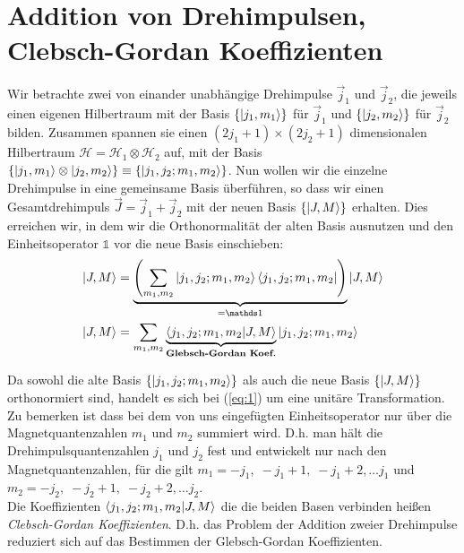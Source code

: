 







\section*{Addition von Drehimpulsen,\\
  Clebsch-Gordan Koeffizienten}
\label{sec:addit-von-dreh}

Wir betrachte zwei von einander unabhängige Drehimpulse \(\vec j_1\) und \(\vec
j_2\), die jeweils einen eigenen Hilbertraum mit der Basis \(\{\left| j_1,m_1 \right\rangle\}\)
für \(\vec j_1\) und \(\{\left| j_2,m_2 \right\rangle\}\) für \(\vec j_2\) bilden. Zusammen
spannen sie einen \((2j_1+1) \times (2j_2+1)\) dimensionalen Hilbertraum
\(\mathcal H = \mathcal H_1 \otimes \mathcal H_2\) auf, mit der Basis
\(\{\left| j_1,m_1 \right\rangle \otimes \left| j_2,m_2 \right\rangle\} \equiv \{\left| j_1,j_2;m_1,m_2 \right\rangle\}\).
Nun wollen wir die einzelne Drehimpulse in eine gemeinsame Basis überführen, so
dass wir einen Gesamtdrehimpuls \(\vec J=\vec j_1+\vec j_2\) mit der neuen Basis
\(\{\left| J,M \right\rangle\}\) erhalten. Dies erreichen wir, in dem wir die Orthonormalität
der alten Basis ausnutzen und den Einheitsoperator \(\mathds 1\) vor die neue
Basis einschieben:
\begin{align}
  \label{eq:1}
  \ket{J,M}&=\underbrace{\left(
      \sum_{m_1,m_2}\ket{j_1,j_2;m_1,m_2}\bra{j_1,j_2;m_1,m_2}
    \right)}_{= \mathds 1}
  \ket{J,M}\notag\\
   \ket{J,M}&= \sum_{m_1,m_2} 
   \underbrace{\braket{j_1,j_2;m_1,m_2}{J,M}}_
   {\text{\textbf{Glebsch-Gordan Koef.}}}
   \ket{j_1,j_2;m_1,m_2}
\end{align}

Da sowohl die alte Basis \( \{\left| j_1,j_2;m_1,m_2 \right\rangle\}\) als auch die neue Basis
\(\{\left| J,M \right\rangle\}\) orthonormiert sind, handelt es sich bei (\ref{eq:1}) um eine
unitäre Transformation. Zu bemerken ist dass bei dem von uns eingefügten
Einheitsoperator nur über die Magnetquantenzahlen \(m_1\) und \(m_2\) summiert
wird. D.h. man hält die Drehimpulsquantenzahlen \(j_1\) und \(j_2\) fest und
entwickelt nur nach den Magnetquantenzahlen, für die gilt \(m_1 = -j_1,\; -j_1+1,
\;-j_1+2, \dots j_1\) und \(m_2 = -j_2, \;-j_2+1,\;-j_2+2, \dots j_2\).\\
Die Koeffizienten \( \braket{j_1,j_2;m_1,m_2}{J,M} \) die die beiden Basen verbinden
heißen \emph{Clebsch-Gordan Koeffizienten}. D.h. das Problem der Addition zweier
Drehimpulse reduziert sich auf das Bestimmen der Glebsch-Gordan Koeffizienten.

